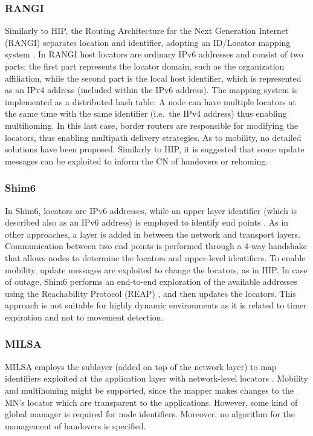 \documentclass[preprint,12pt]{elsarticle}
\begin{document}
\subsubsection{RANGI}
Similarly to HIP, the Routing Architecture for the Next 
Generation Internet (RANGI) separates location and 
identifier, adopting an ID/Locator
mapping system \cite{rangi}.
In RANGI host locators are ordinary IPv6 addresses and consist of two parts: 
the first part represents the locator domain, such as the organization 
affiliation, while the second part is the local host identifier, which is 
represented as an IPv4 address (included within the IPv6 address).
The mapping system is implemented as a distributed hash table.
A node can have multiple locators at the same time with the same identifier 
(i.e.~the IPv4 address) thus enabling multihoming. 
In this last case, border routers are responsible for modifying the locators, thus enabling multipath delivery strategies. As to mobility, no detailed solutions have been proposed. Similarly to HIP, it is suggested that some update messages can be exploited to inform the CN of handovers or rehoming.

\subsubsection{Shim6}
In Shim6, locators are IPv6 addresses, while an upper layer 
identifier (which is described also as an IPv6 address) is employed to identify 
end points \cite{rfc5533}. As in other approaches, a layer is added in between 
the network and transport layers.
Communication between two end points is performed through a 4-way handshake 
that allows nodes to determine the locators and upper-level identifiers.
To enable mobility, update messages are exploited to change the locators, as in 
HIP.
In case of outage, Shim6 
performs an end-to-end exploration of the available addresses using the Reachability Protocol (REAP) \cite{rfc5534},
and then
updates the locators. This approach is not suitable for highly dynamic 
environments as it is related to timer expiration and not to movement 
detection. 

\subsubsection{MILSA}
MILSA employs the sublayer (added on top of the network layer) to map identifiers exploited at the application layer with
network-level locators \cite{Pan:2010}. 
Mobility and multihoming might be supported, since the mapper makes changes to the MN’s locator which are transparent to the applications. However, some kind of global manager is required for node identifiers. Moreover, no algorithm for the management of handovers is specified.
\end{document}
